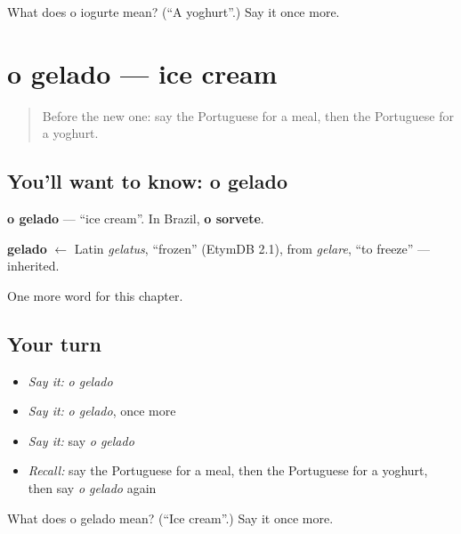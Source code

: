 \begin{tcolorbox}[breakable,colback=teal!4,colframe=teal!35!black,title={Before you move on}]
What does o iogurte mean? (\textquotedblleft{}A yoghurt\textquotedblright{}.) Say it once more.
\end{tcolorbox}
\section[o gelado]{o gelado — ice cream}

\label{lesson:PT-C108-gelado}



\begin{quote}
Before the new one: say the Portuguese for a meal, then the Portuguese for a yoghurt.
\end{quote}

\subsection*{You'll want to know: o gelado}
\textbf{o gelado} — \textquotedblleft{}ice cream\textquotedblright{}. In Brazil, \textbf{o sorvete}.

\begin{cousinweb}
\textbf{gelado} $\leftarrow$ Latin \emph{gelatus}, \textquotedblleft{}frozen\textquotedblright{} (EtymDB 2.1), from \emph{gelare}, \textquotedblleft{}to freeze\textquotedblright{} — inherited.
\end{cousinweb}

\begin{grammarlens}[title={What you've built}]
One more word for this chapter.
\end{grammarlens}

\subsection*{Your turn}
\begin{itemize}
\raggedright
  \item \emph{Say it:} \emph{o gelado}
  \item \emph{Say it:} \emph{o gelado}, once more
  \item \emph{Say it:} say \emph{o gelado}
  \item \emph{Recall:} say the Portuguese for a meal, then the Portuguese for a yoghurt, then say \emph{o gelado} again
\end{itemize}

\begin{tcolorbox}[breakable,colback=teal!4,colframe=teal!35!black,title={Before you move on}]
What does o gelado mean? (\textquotedblleft{}Ice cream\textquotedblright{}.) Say it once more.
\end{tcolorbox}
